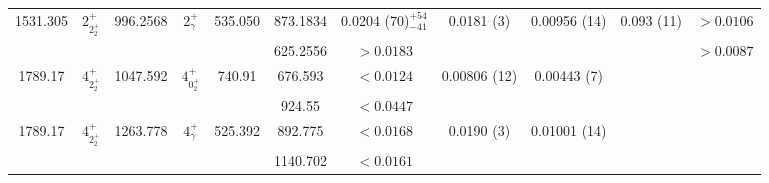 \begin{landscape}
\begin{longtable}{>{\footnotesize}c|>{\footnotesize}c|>{\footnotesize}c|>{\footnotesize}c|>{\footnotesize}c|>{\footnotesize}c|>{\footnotesize}c|>{\footnotesize}c|>{\footnotesize}c|>{\footnotesize}c|>{\footnotesize}c}
        1531.305 & $2^+_{2^+_2}$ & 996.2568 & $2^+_{\gamma}$ & 535.050 & 873.1834 & 0.0204 (70)$^{+54}_{-41}$ & 0.0181 (3) & 0.00956 (14) & 0.093 (11)  & $>0.0106$\\
        & & & &  & 625.2556 & $>0.0183$ & & & & $>0.0087$\\ \hline
        1789.17 & $4^+_{2^+_2}$ & 1047.592 & $4^+_{0^+_2}$ & 740.91 & 676.593 & $<0.0124$ & 0.00806 (12) & 0.00443 (7) & \\
        &  & &  &  & 924.55 & $<0.0447$ & & &  \\ \hline
        1789.17 & $4^+_{2^+_2}$ & 1263.778 & $4^+_{\gamma}$ & 525.392 & 892.775 & $<0.0168$ & 0.0190 (3) & 0.01001 (14) &  \\
        &  & &  &  & 1140.702 & $<0.0161$ & & &  \\
        \bottomrule
    \end{longtable}
\end{landscape}